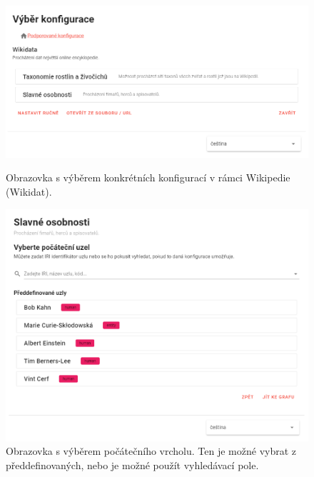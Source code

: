 \begin{figure}
    \centering
    \includegraphics[width=\textwidth]{media/configuration.png}
    \caption{Obrazovka s výběrem konkrétních konfigurací v rámci Wikipedie (Wikidat).}
    \includegraphics[width=\textwidth]{media/node-selection.png}
    \caption{Obrazovka s výběrem počátečního vrcholu. Ten je možné vybrat z předdefinovaných, nebo je možné použít vyhledávací pole.}
\end{figure}

\newpage

